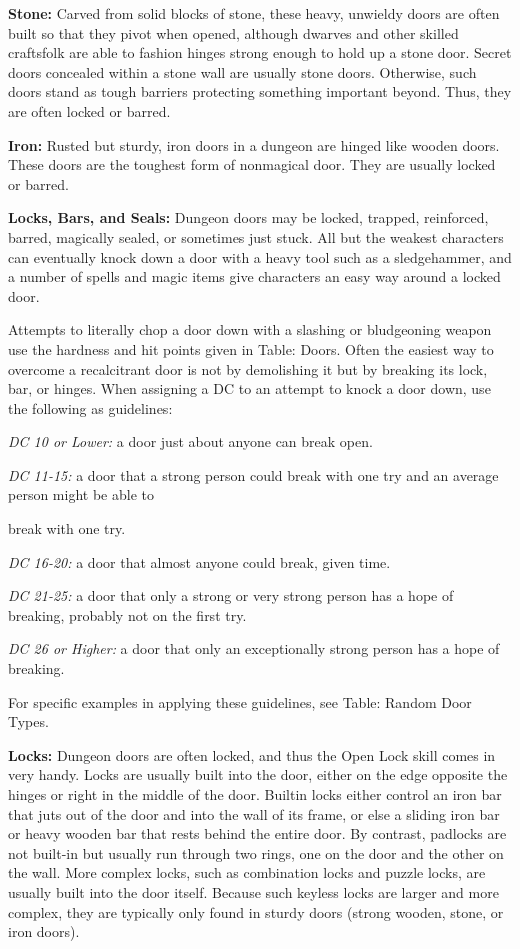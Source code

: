 \documentclass{article}
\begin{document}
\textbf{Stone:} Carved from solid blocks of stone, these heavy, unwieldy doors 
are often built so that they pivot when opened, although dwarves and other skilled 
craftsfolk are able to fashion hinges strong enough to hold up a stone door. Secret 
doors concealed within a stone wall are usually stone doors. Otherwise, such doors 
stand as tough barriers protecting something important beyond. Thus, they are often 
locked or barred.

\textbf{Iron: }Rusted but sturdy, iron doors in a dungeon are hinged like wooden 
doors. These doors are the toughest form of nonmagical door. They are usually locked 
or barred.

\textbf{Locks, Bars, and Seals:} Dungeon doors may be locked, trapped, reinforced, 
barred, magically sealed, or sometimes just stuck. All but the weakest characters 
can eventually knock down a door with a heavy tool such as a sledgehammer, and 
a number of spells and magic items give characters an easy way around a locked 
door.

Attempts to literally chop a door down with a slashing or bludgeoning weapon use 
the hardness and hit points given in Table: Doors. Often the easiest way to overcome 
a recalcitrant door is not by demolishing it but by breaking its lock, bar, or 
hinges. When assigning a DC to an attempt to knock a door down, use the following 
as guidelines:

\textit{DC 10 or Lower: }a door just about anyone can break open.

\textit{DC 11-15: }a door that a strong person could break with one try and an 
average person might be able to

break with one try. 

\textit{DC 16-20: }a door that almost anyone could break, given time.

\textit{DC 21-25: }a door that only a strong or very strong person has a hope of 
breaking, probably not on the first try.

\textit{DC 26 or Higher: }a door that only an exceptionally strong person has a 
hope of breaking.

For specific examples in applying these guidelines, see Table: Random Door Types. 

\textbf{Locks:} Dungeon doors are often locked, and thus the Open Lock skill comes 
in very handy. Locks are usually built into the door, either on the edge opposite 
the hinges or right in the middle of the door. Builtin locks either control an 
iron bar that juts out of the door and into the wall of its frame, or else a sliding 
iron bar or heavy wooden bar that rests behind the entire door. By contrast, padlocks 
are not built-in but usually run through two rings, one on the door and the other 
on the wall. More complex locks, such as combination locks and puzzle locks, are 
usually built into the door itself. Because such keyless locks are larger and more 
complex, they are typically only found in sturdy doors (strong wooden, stone, or 
iron doors).
\end{document}

